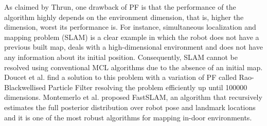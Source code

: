 As claimed by Thrun, one drawback of PF is that the performance of the algorithm highly depends on the environment dimension, that is, higher the dimension, worst its performance is. For instance, simultaneous localization and mapping problem (SLAM) is a clear example in which the robot does not have a previous built map, deals with a high-dimensional environment and does not have any information about its initial position. Consequently, SLAM cannot be resolved using conventional MCL algorithms due to the absence of an initial map. Doucet et al. find a solution to this problem with a variation of PF called Rao-Blackwellised Particle Filter resolving the problem efficiently up until 100000 dimensions\cite{Doucet:2000:RPF:2073946.2073968}. Montemerlo et al. proposed FastSLAM, an algorithm that recursively estimates the full posterior distribution over robot pose and landmark locations\cite{Montemerlo02a} and it is one of the most robust algorithms for mapping in-door environments\cite{Thrun:particle-filter-robotics}.













